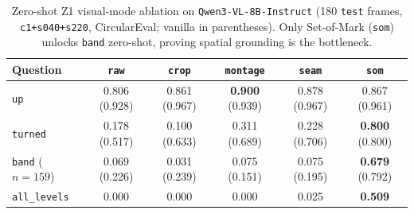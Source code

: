 \begin{table}[h]
  \centering
  \caption{Zero-shot Z1 visual-mode ablation on \texttt{Qwen3-VL-8B-Instruct} (180 \texttt{test} frames, \texttt{c1+s040+s220}, CircularEval; vanilla in parentheses). Only Set-of-Mark (\texttt{som}) unlocks \texttt{band} zero-shot, proving spatial grounding is the bottleneck.}
  \label{tab:app_z1_modes}
  \small
  \begin{tabular}{lccccc}
    \toprule
    Question & \texttt{raw} & \texttt{crop} & \texttt{montage} & \texttt{seam} & \texttt{som} \\
    \midrule
    \texttt{up} & 0.806 (0.928) & 0.861 (0.967) & \textbf{0.900} (0.939) & 0.878 (0.967) & 0.867 (0.961) \\
    \texttt{turned} & 0.178 (0.517) & 0.100 (0.633) & 0.311 (0.689) & 0.228 (0.706) & \textbf{0.800} (0.800) \\
    \texttt{band} ($n=159$) & 0.069 (0.226) & 0.031 (0.239) & 0.075 (0.151) & 0.075 (0.195) & \textbf{0.679} (0.792) \\
    \texttt{all\_levels} & 0.000 & 0.000 & 0.000 & 0.025 & \textbf{0.509} \\
    \bottomrule
  \end{tabular}
\end{table}

\begin{table}[h]
  \centering
  \caption{Public spatial benchmark retention after frozen-ViT LoRA SFT (\texttt{C1-v1}, Job \texttt{1175804}) vs.\ base \texttt{Qwen3-VL-8B-Instruct} (Job \texttt{1166604}). Truncation drops from 6.6--7.8\% to 0.0\%.}
  \label{tab:app_public_bench}
  \small
\end{table}

